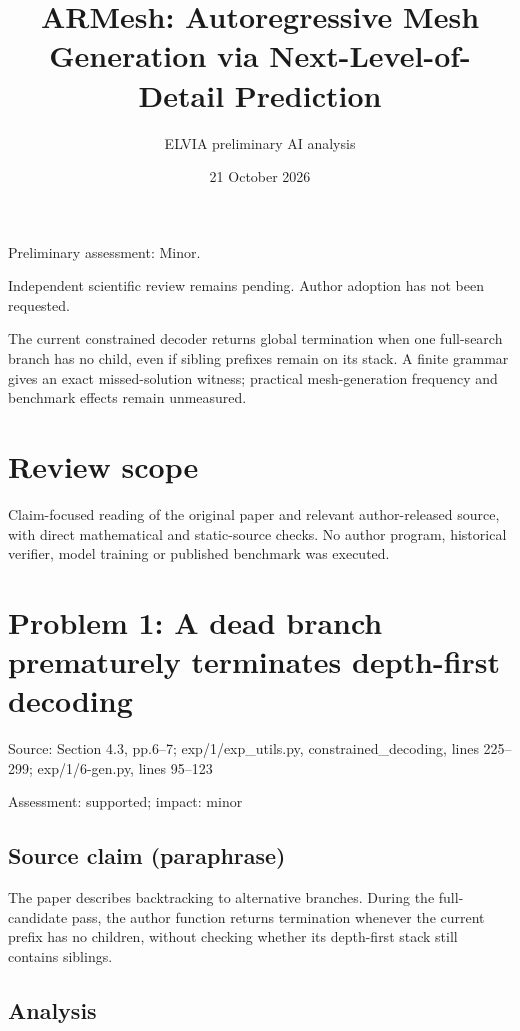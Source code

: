 \documentclass[11pt]{article}
\begin{document}
\title{ARMesh: Autoregressive Mesh Generation via Next-Level-of-Detail Prediction}

\author{ELVIA preliminary AI analysis}\date{21 October 2026}\maketitle

Preliminary assessment: Minor.\par

Independent scientific review remains pending. Author adoption has not been requested.

The current constrained decoder returns global termination when one full-search branch has no child, even if sibling prefixes remain on its stack. A finite grammar gives an exact missed-solution witness; practical mesh-generation frequency and benchmark effects remain unmeasured.

\section*{Review scope}

Claim-focused reading of the original paper and relevant author-released source, with direct mathematical and static-source checks. No author program, historical verifier, model training or published benchmark was executed.

\section*{Problem 1: A dead branch prematurely terminates depth-first decoding}

Source: Section 4.3, pp.6–7; exp/1/exp\_utils.py, constrained\_decoding, lines 225–299; exp/1/6-gen.py, lines 95–123

Assessment: supported; impact: minor

\subsection*{Source claim (paraphrase)}

The paper describes backtracking to alternative branches. During the full-candidate pass, the author function returns termination whenever the current prefix has no children, without checking whether its depth-first stack still contains siblings.

\subsection*{Analysis}
\end{document}
